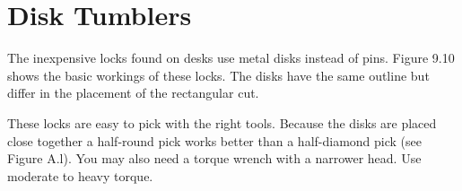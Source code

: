 \section{Disk Tumblers}
The inexpensive locks found on desks use metal disks instead of pins. Figure 9.10 shows the
basic workings of these locks. The disks have the same outline but differ in the placement
of the rectangular cut.

These locks are easy to pick with the right tools. Because the disks are placed close
together a half-round pick works better than a half-diamond pick (see Figure A.l). You may
also need a torque wrench with a narrower head. Use moderate to heavy torque.
